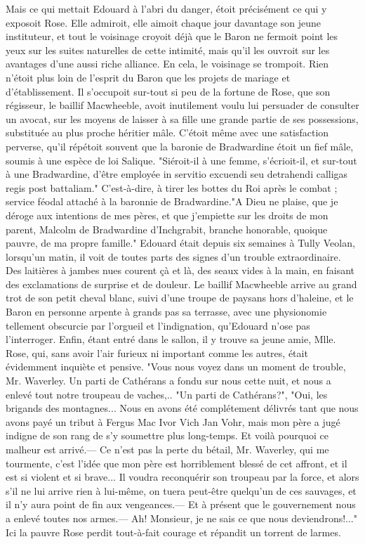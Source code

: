 Mais ce qui mettait Edouard à l'abri du danger, étoit précisément ce qui y exposoit Rose. Elle admiroit, elle aimoit chaque jour davantage son jeune instituteur, et tout le voisinage croyoit déjà que le Baron ne fermoit point les yeux sur les suites naturelles de cette intimité, mais qu'il les ouvroit sur les avantages d'une aussi riche alliance. En cela, le voisinage se trompoit. Rien n'étoit plus loin de l'esprit du Baron que les projets de mariage et d'établissement. Il s'occupoit sur-tout si peu de la fortune de Rose, que son régisseur, le baillif Macwheeble, avoit inutilement voulu lui persuader de consulter un avocat, sur les moyens de laisser à sa fille une grande partie de ses possessions, substituée au plus proche héritier mâle. C'étoit même avec une satisfaction perverse, qu'il répétoit souvent que la baronie de Bradwardine étoit un fief mâle, soumis à une espèce de loi Salique. "Siéroit-il à une femme, s'écrioit-il, et sur-tout à une Bradwardine, d'être employée in servitio excuendi seu detrahendi calligas regis post\setcounter{page}{555} battaliam." C'est-à-dire, à tirer les bottes du Roi après le combat ; service féodal attaché à la baronnie de Bradwardine."A Dieu ne plaise, que je déroge aux intentions de mes pères, et que j'empiette sur les droits de mon parent, Malcolm de Bradwardine d'Inchgrabit, branche honorable, quoique pauvre, de ma propre famille."
Edouard était depuis six semaines à Tully Veolan, lorsqu'un matin, il voit de toutes parts des signes d'un trouble extraordinaire. Des laitières à jambes nues courent çà et là, des seaux vides à la main, en faisant des exclamations de surprise et de douleur. Le baillif Macwheeble arrive au grand trot de son petit cheval blanc, suivi d'une troupe de paysans hors d'haleine, et le Baron en personne arpente à grands pas sa terrasse, avec une physionomie tellement obscurcie par l'orgueil et l'indignation, qu'Edouard n'ose pas l'interroger. Enfin, étant entré dans le sallon, il y trouve sa jeune amie, Mlle. Rose, qui, sans avoir l'air furieux ni important comme les autres, était évidemment inquiète et pensive.
"Vous nous voyez dans un moment de trouble, Mr. Waverley. Un parti de Cathérans a fondu sur nous cette nuit, et nous a enlevé tout notre troupeau de vaches,..\setcounter{page}{556} "Un parti de Cathérans?", "Oui, les brigands des montagnes... Nous en avons été complétement délivrés tant que nous avons payé un tribut à Fergus Mac Ivor Vich Jan Vohr, mais mon père a jugé indigne de son rang de s'y soumettre plus long-temps. Et voilà pourquoi ce malheur est arrivé.— Ce n'est pas la perte du bétail, Mr. Waverley, qui me tourmente, c'est l'idée que mon père est horriblement blessé de cet affront, et il est si violent et si brave... Il voudra reconquérir son troupeau par la force, et alors s'il ne lui arrive rien à lui-même, on tuera peut-être quelqu'un de ces sauvages, et il n'y aura point de fin aux vengeances.— Et à présent que le gouvernement nous a enlevé toutes nos armes.— Ah! Monsieur, je ne sais ce que nous deviendrons!..." Ici la pauvre Rose perdit tout-à-fait courage et répandit un torrent de larmes.
